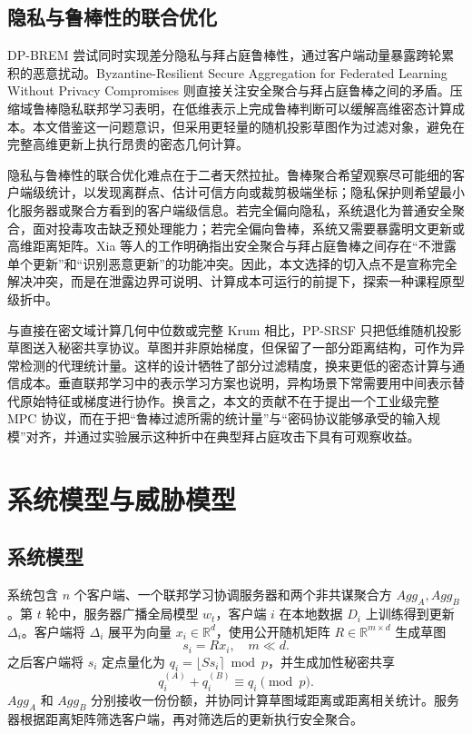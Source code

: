 \documentclass[final]{jcr}
\begin{document}
\subsection{隐私与鲁棒性的联合优化}
DP-BREM 尝试同时实现差分隐私与拜占庭鲁棒性，通过客户端动量暴露跨轮累积的恶意扰动\cite{gu2025dpbrem}。Byzantine-Resilient Secure Aggregation for Federated Learning Without Privacy Compromises 则直接关注安全聚合与拜占庭鲁棒之间的矛盾\cite{xia2024secureagg}。压缩域鲁棒隐私联邦学习表明，在低维表示上完成鲁棒判断可以缓解高维密态计算成本\cite{hu2024compressive}。本文借鉴这一问题意识，但采用更轻量的随机投影草图作为过滤对象，避免在完整高维更新上执行昂贵的密态几何计算。

隐私与鲁棒性的联合优化难点在于二者天然拉扯。鲁棒聚合希望观察尽可能细的客户端级统计，以发现离群点、估计可信方向或裁剪极端坐标；隐私保护则希望最小化服务器或聚合方看到的客户端级信息。若完全偏向隐私，系统退化为普通安全聚合，面对投毒攻击缺乏预处理能力；若完全偏向鲁棒，系统又需要暴露明文更新或高维距离矩阵。Xia 等人的工作明确指出安全聚合与拜占庭鲁棒之间存在“不泄露单个更新”和“识别恶意更新”的功能冲突\cite{xia2024secureagg}。因此，本文选择的切入点不是宣称完全解决冲突，而是在泄露边界可说明、计算成本可运行的前提下，探索一种课程原型级折中。

与直接在密文域计算几何中位数或完整 Krum 相比，PP-SRSF 只把低维随机投影草图送入秘密共享协议。草图并非原始梯度，但保留了一部分距离结构，可作为异常检测的代理统计量。这样的设计牺牲了部分过滤精度，换来更低的密态计算与通信成本。垂直联邦学习中的表示学习方案也说明，异构场景下常需要用中间表示替代原始特征或梯度进行协作\cite{wang2025pravfed}。换言之，本文的贡献不在于提出一个工业级完整 MPC 协议，而在于把“鲁棒过滤所需的统计量”与“密码协议能够承受的输入规模”对齐，并通过实验展示这种折中在典型拜占庭攻击下具有可观察收益。

\section{系统模型与威胁模型}
\subsection{系统模型}
系统包含 $n$ 个客户端、一个联邦学习协调服务器和两个非共谋聚合方 $Agg_A,Agg_B$。第 $t$ 轮中，服务器广播全局模型 $w_t$，客户端 $i$ 在本地数据 $D_i$ 上训练得到更新 $\Delta_i$。客户端将 $\Delta_i$ 展平为向量 $x_i\in\mathbb{R}^{d}$，使用公开随机矩阵 $R\in\mathbb{R}^{m\times d}$ 生成草图
\[
s_i = R x_i,\quad m \ll d.
\]
之后客户端将 $s_i$ 定点量化为 $q_i=\lfloor S s_i\rceil\bmod p$，并生成加性秘密共享
\[
q_i^{(A)} + q_i^{(B)} \equiv q_i \pmod p.
\]
$Agg_A$ 和 $Agg_B$ 分别接收一份份额，并协同计算草图域距离或距离相关统计。服务器根据距离矩阵筛选客户端，再对筛选后的更新执行安全聚合。
\end{document}
